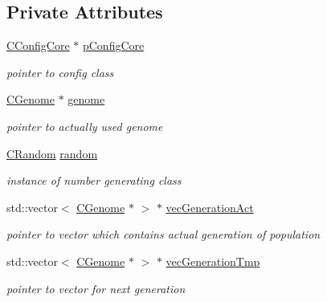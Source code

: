 \subsection*{Private Attributes}
\begin{DoxyCompactItemize}
\item 
\hypertarget{classCSelection_a5e9545813cd295ece924bb1aa23bad44}{
\hyperlink{classCConfigCore}{CConfigCore} $\ast$ \hyperlink{classCSelection_a5e9545813cd295ece924bb1aa23bad44}{pConfigCore}}
\label{classCSelection_a5e9545813cd295ece924bb1aa23bad44}

\begin{DoxyCompactList}\small\item\em pointer to config class \item\end{DoxyCompactList}\item 
\hypertarget{classCSelection_ace8ab23fbb701b9b51f1e62811bd5c50}{
\hyperlink{classCGenome}{CGenome} $\ast$ \hyperlink{classCSelection_ace8ab23fbb701b9b51f1e62811bd5c50}{genome}}
\label{classCSelection_ace8ab23fbb701b9b51f1e62811bd5c50}

\begin{DoxyCompactList}\small\item\em pointer to actually used genome \item\end{DoxyCompactList}\item 
\hypertarget{classCSelection_a16f64d04954d473574c3242ed3d921d5}{
\hyperlink{classCRandom}{CRandom} \hyperlink{classCSelection_a16f64d04954d473574c3242ed3d921d5}{random}}
\label{classCSelection_a16f64d04954d473574c3242ed3d921d5}

\begin{DoxyCompactList}\small\item\em instance of number generating class \item\end{DoxyCompactList}\item 
\hypertarget{classCSelection_a6390c2640995d4af17dab0c03d889b6f}{
std::vector$<$ \hyperlink{classCGenome}{CGenome} $\ast$ $>$ $\ast$ \hyperlink{classCSelection_a6390c2640995d4af17dab0c03d889b6f}{vecGenerationAct}}
\label{classCSelection_a6390c2640995d4af17dab0c03d889b6f}

\begin{DoxyCompactList}\small\item\em pointer to vector which contains actual generation of population \item\end{DoxyCompactList}\item 
\hypertarget{classCSelection_aaa40edfb88f4dad0ebdc56931bef7e0c}{
std::vector$<$ \hyperlink{classCGenome}{CGenome} $\ast$ $>$ $\ast$ \hyperlink{classCSelection_aaa40edfb88f4dad0ebdc56931bef7e0c}{vecGenerationTmp}}
\label{classCSelection_aaa40edfb88f4dad0ebdc56931bef7e0c}

\begin{DoxyCompactList}\small\item\em pointer to vector for next generation \item\end{DoxyCompactList}\end{DoxyCompactItemize}


